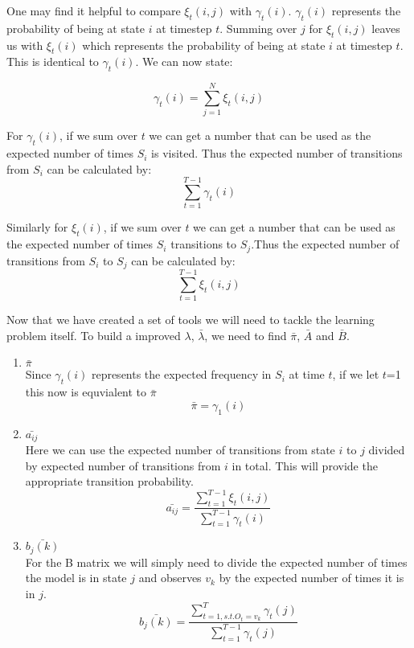 One may find it helpful to compare $\xi_t(i,j)$ with $\gamma_t(i)$. $\gamma_t(i)$ represents the probability of being at state $i$ at timestep $t$. Summing over $j$ for $\xi_t(i,j)$ leaves us with $\xi_t(i)$ which represents the probability of being at state $i$ at timestep $t$. This is identical to $\gamma_t(i)$. We can now state: 

\begin{equation}
    \gamma_t(i) = \sum_{j=1}^N \xi_t(i,j)
\end{equation}

For $\gamma_t(i)$, if we sum over $t$ we can get a number that can be used as the expected number of times $S_i$ is visited. Thus the expected number of transitions from $S_i$ can be calculated by:
\begin{equation}
    \sum_{t=1}^{T-1} \gamma_t(i)
\end{equation}

Similarly for $\xi_t(i)$, if we sum over $t$ we can get a number that can be used as the expected number of times $S_i$ transitions to $S_j$.Thus the expected number of transitions from $S_i$ to $S_j$ can be calculated by:
\begin{equation}
    \sum_{t=1}^{T-1} \xi_t(i,j)
\end{equation}



Now that we have created a set of tools we will need to tackle the learning problem itself. To build a improved $\lambda$, $\bar{\lambda}$, we need to find $\bar{\pi}$, $\bar{A}$ and $\bar{B}$.

\begin{enumerate}[i]
    \item $\bar{\pi}$ \\
    Since $\gamma_t(i)$ represents the expected frequency in $S_i$ at time $t$, if we let $t$=1 this now is equvialent to $\bar{\pi}$ \\
    \begin{equation}
        \bar{\pi} = \gamma_1(i)
    \end{equation}

    \item $\bar{a_{ij}}$ \\
    Here we can use the expected number of transitions from state $i$ to $j$ divided by expected number of transitions from $i$ in total. This will provide the appropriate transition probability. \\
    \begin{equation}
        \bar{a_{ij}} = \dfrac{\sum_{t=1}^{T-1} \xi_t(i,j)}{\sum_{t=1}^{T-1} \gamma_t(i)}
    \end{equation}

    \item $\bar{b_j(k)}$ \\
    For the B matrix we will simply need to divide  the expected number of times the model is in state $j$ and observes $v_k$ by the expected number of times it is in $j$.
    \begin{equation}
        \bar{b_j(k)} = \dfrac{\sum_{t=1, s.t. O_t = v_k}^T \gamma_t(j)}{\sum_{t=1}^{T-1} \gamma_t(j)}
    \end{equation} 
\end{enumerate}

